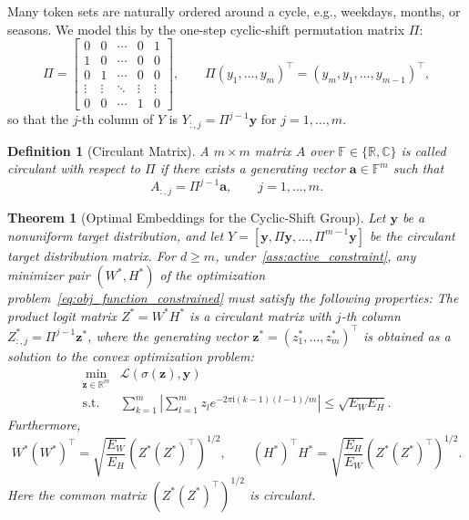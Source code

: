 \documentclass[11pt]{article}
\newtheorem{definition}{Definition}
\newtheorem{theorem}{Theorem}
\begin{document}
Many token sets are naturally ordered around a cycle, e.g., weekdays, months, or seasons. We model this by the one-step cyclic-shift permutation matrix \(\Pi\):
\begin{equation}
\label{eq:cyclic}
\Pi=\begin{bmatrix}
0 & 0 & \cdots & 0 & 1\\
1 & 0 & \cdots & 0 & 0\\
0 & 1 & \cdots & 0 & 0\\
\vdots & \vdots & \ddots & \vdots & \vdots\\
0 & 0 & \cdots & 1 & 0
\end{bmatrix},
\qquad
\Pi(y_1,\ldots,y_m)^\top=(y_m,y_1,\ldots,y_{m-1})^\top,
\end{equation}
so that the \(j\)-th column of \(Y\) is \(Y_{:,j}=\Pi^{j-1}\boldsymbol{y}\) for \(j=1,\ldots,m\).

\begin{definition}[Circulant Matrix]
A \(m\times m\) matrix \(A\) over \(\mathbb F\in\{\mathbb R,\mathbb C\}\) is called circulant with respect to \(\Pi\) if there exists a generating vector \(\boldsymbol a\in\mathbb F^m\) such that
\[
A_{:,j}=\Pi^{j-1}\boldsymbol a,\qquad j=1,\ldots,m.
\]
\end{definition}

\begin{theorem}[Optimal Embeddings for the Cyclic-Shift Group]
\label{thm:single_block_cyclic}
Let \(\boldsymbol{y}\) be a nonuniform target distribution, and let \(Y=[\boldsymbol{y},\Pi\boldsymbol{y},\ldots,\Pi^{m-1}\boldsymbol{y}]\) be the circulant target distribution matrix. For \(d \ge m\), under~\cref{ass:active_constraint}, any minimizer pair \((W^*,H^*)\) of the optimization problem~\cref{eq:obj_function_constrained} must satisfy the following properties:
The product logit matrix \(Z^*=W^*H^*\) is a circulant matrix with \(j\)-th column \(Z^*_{:,j}=\Pi^{j-1}\boldsymbol z^*\), where the generating vector \(\boldsymbol{z}^*  = (z^*_{1}, \ldots, z^*_{m})^\top\) is obtained as a solution to the convex optimization problem:
\[
\begin{aligned}
\min_{\boldsymbol{z} \in\mathbb R^{m}}
 & \mathcal L \left(\sigma(\boldsymbol{z} ), \boldsymbol{y}\right)
\\
\text{s.t. } & \sum_{k=1}^{m}\left| \sum_{l=1}^{m} z_{l} e^{-2\pi \mathrm{i} (k-1)(l-1)/m} \right| \le \sqrt{E_W E_H}.
\end{aligned}
\]
Furthermore,
\[ W^*(W^*)^\top = \sqrt{\frac{E_W}{E_H}} (Z^* (Z^*)^\top)^{1/2}, \qquad (H^*)^\top H^* = \sqrt{\frac{E_H}{E_W}} (Z^* (Z^*)^\top)^{1/2}. \]
Here the common matrix \((Z^* (Z^*)^\top)^{1/2}\) is circulant.
\end{theorem}
\end{document}
